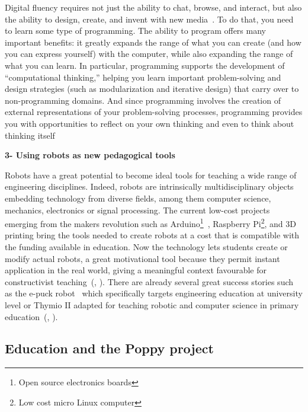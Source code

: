 \begin{formal}
    Digital fluency requires not just the ability to chat, browse, and interact, but also the ability to design, create, and invent with new media~\parencite{resnick2008sowing}. To do that, you need to learn some type of programming. The ability to program offers many important benefits: it greatly expands the range of what you can create (and how you can express yourself) with the computer, while also expanding the range of what you can learn. In particular, programming supports the development of “computational thinking,” helping you learn important problem-solving and design strategies (such as modularization and iterative design) that carry over to non-programming domains. And since programming involves the creation of external representations of your problem-solving processes, programming provides you with opportunities to reflect on your own thinking and even to think about thinking itself~\parencite{disessa2001changing}

\end{formal}


\textbf{3- Using robots as new pedagogical tools}

Robots have a great potential to become ideal tools for teaching a wide range of engineering disciplines. Indeed, robots are intrinsically multidisciplinary objects embedding technology from diverse fields, among them computer science, mechanics, electronics or signal processing.
The current low-cost projects emerging from the makers revolution\parencite{anderson2012makers} such as Arduino\footnote{Open source electronics boards}~\parencite{mellis2007arduino}, Raspberry Pi\footnote{Low cost micro Linux computer}, and 3D printing bring the tools needed to create robots at a cost that is compatible with the funding available in education. Now the technology lets students create or modify actual robots, a great motivational tool because they permit instant application in the real world, giving a meaningful context favourable for constructivist teaching~(\cite{palincsar1998social}, \cite{papert1991situating}).
There are already several great success stories such as the e-puck robot~\parencite{mondada2009puck} which specifically targets engineering education at university level or Thymio II adapted for teaching robotic and computer science in primary education~(\cite{riedo2012two}, \cite{riedo2013thymio}).


\subsection{Education and the Poppy project} %

